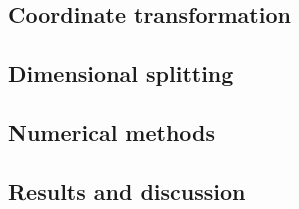 \documentclass[11pt]{article}
\begin{document}
\subsection{Coordinate transformation}

\subsection{Dimensional splitting}

\subsection{Numerical methods}

\subsection{Results and discussion}

\newpage


\end{document}

